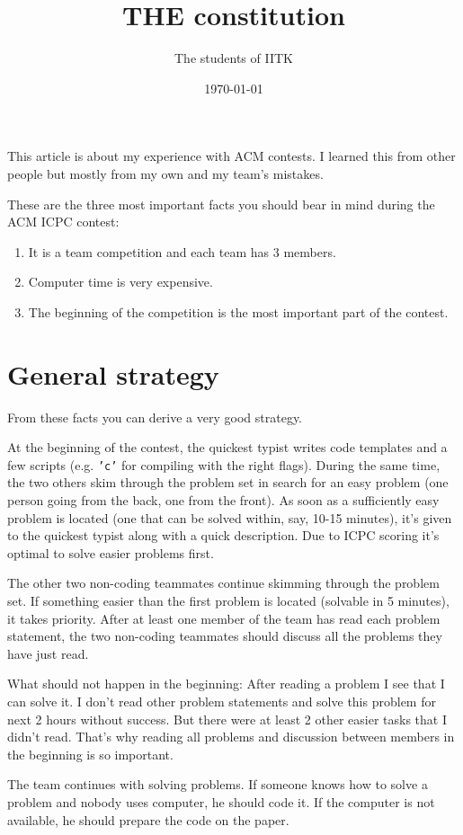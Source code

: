 \documentclass{article}
\author{The students of IITK}
\title{THE constitution}
\date{\today}
\begin{document}
\maketitle
This article is about my experience with ACM contests. I learned this from other
people but mostly from my own and my team's mistakes.

These are the three most important facts you should bear in mind during the ACM ICPC
contest:
\begin{enumerate}
\item It is a team competition and each team has 3 members.
\item Computer time is very expensive.
\item The beginning of the competition is the most important part of the contest.
\end{enumerate}

\section{General strategy}
From these facts you can derive a very good strategy.

At the beginning of the contest, the quickest typist writes code templates and a
few scripts (e.g. {\tt 'c'} for compiling with the right flags). During the same
time, the two others skim through the problem set in search for an easy problem
(one person going from the back, one from the front). As soon as a sufficiently
easy problem is located (one that can be solved within, say, 10-15 minutes),
it's given to the quickest typist along with a quick description. Due to ICPC
scoring it's optimal to solve easier problems first.

The other two non-coding teammates continue skimming through the problem set.
If something easier than the first problem is located (solvable in 5 minutes),
it takes priority. After at least one member of the team has read each problem
statement, the two non-coding teammates should discuss all the problems they
have just read.

What should not happen in the beginning: After reading a problem I see that I
can solve it. I don't read other problem statements and solve this problem for
next 2 hours without success. But there were at least 2 other easier tasks that
I didn't read. That's why reading all problems and discussion between members in
the beginning is so important.

The team continues with solving problems. If someone knows how to solve a
problem and nobody uses computer, he should code it. If the computer is not
available, he should prepare the code on the paper.
\end{document}
